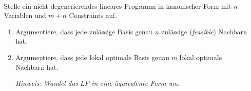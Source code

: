 \documentclass{uebung_cs}
\begin{document}
\begin{aufgabe}\
%
%
	
	Stelle ein nicht-degenerierendes lineares Programm in kanonischer Form mit $n$ Variablen und $m + n$ Constraints auf.
	\begin{enumerate}
		\item Argumentiere, dass jede zulässige Basis genau $n$ zulässige (\textit{feasible}) Nachbarn hat.
		\item Argumentiere, dass jede lokal optimale Basis genau $m$ lokal optimale Nachbarn hat.
		
		\emph{Hinweis: Wandel das LP in eine äquivalente Form um.}
	\end{enumerate}
\end{aufgabe}
\end{document}
